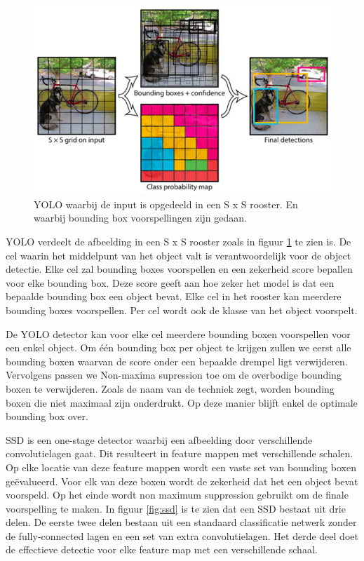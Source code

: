 \begin{figure}[!ht]
	\centering
	\includegraphics[width=0.60\linewidth]{fig/YOLO.jpg}
	\caption{YOLO waarbij de input is opgedeeld in een S x S rooster. 
	En waarbij bounding box voorspellingen zijn gedaan.}
	\label{fig:yolo}
\end{figure}

YOLO \cite{redmon_you_2016} verdeelt de afbeelding in een S x S rooster zoals in figuur \ref{fig:yolo} te zien is. 
De cel waarin het middelpunt van het object valt is verantwoordelijk voor de object detectie.
Elke cel zal bounding boxes voorspellen en een zekerheid score bepallen voor elke bounding box. 
Deze score geeft aan hoe zeker het model is dat een bepaalde bounding box een object bevat.
Elke cel in het rooster kan meerdere bounding boxes voorspellen.
Per cel wordt ook de klasse van het object voorspelt.

De YOLO detector kan voor elke cel meerdere bounding boxen voorspellen voor een enkel object.
Om \'e\'en bounding box per object te krijgen zullen we eerst alle bounding boxen waarvan de score onder een bepaalde drempel ligt verwijderen.
Vervolgens passen we Non-maxima supression toe om de overbodige bounding boxen te verwijderen. 
Zoals de naam van de techniek zegt, worden bounding boxen die niet maximaal zijn onderdrukt.
Op deze manier blijft enkel de optimale bounding box over.

SSD \cite{liu_ssd_2016} is een one-stage detector waarbij een afbeelding door verschillende convolutielagen gaat.
Dit resulteert in feature mappen met verschillende schalen.
Op elke locatie van deze feature mappen wordt een vaste set van bounding boxen ge\"evalueerd.
Voor elk van deze boxen wordt de zekerheid dat het een object bevat voorspeld.
Op het einde wordt non maximum suppression gebruikt om de finale voorspelling te maken.
In figuur \ref{fig:ssd} is te zien dat een SSD bestaat uit drie delen.
De eerste twee delen bestaan uit een standaard classificatie netwerk zonder de fully-connected lagen en een set van extra convolutielagen.
Het derde deel doet de effectieve detectie voor elke feature map met een verschillende schaal. 

